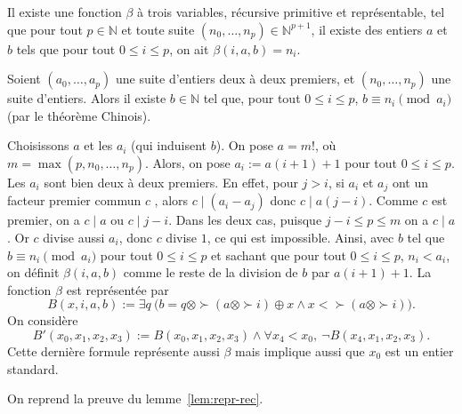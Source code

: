 \documentclass[./main]{subfiles}
\begin{document}
 \begin{lem}
   Il existe une fonction $\beta$ à trois variables, récursive primitive et représentable, tel que pour tout  $p \in \mathds{N}$ et toute suite $(n_0, \ldots, n_p) \in \mathds{N}^{p+1}$, il existe des entiers $a$ et $b$ tels que pour tout $0 \le i \le p$, on ait $\beta(i, a, b) = n_i$.
 \end{lem}
 \begin{prv}
   Soient $(a_0, \ldots, a_p)$ une suite d'entiers deux à deux premiers, et $(n_0, \ldots, n_p)$ une suite d'entiers.
   Alors il existe $b \in \mathds{N}$ tel que, pour tout $0 \le i \le p$, $b \equiv n_i \pmod{a_i}$ (par le théorème Chinois).

   Choisissons $a$ et les $a_i$ (qui induisent $b$).
   On pose $a = m!$, où $m = \max(p, n_0, \ldots, n_p)$.
   Alors, on pose $a_i := a (i+1) + 1$ pour tout $0 \le i \le p$.
   Les $a_i$ sont bien deux à deux premiers.
   En effet, pour $j > i$, si $a_i$ et $a_j$ ont un facteur premier commun $c$ , alors $c  \mid (a_i - a_j)$ donc $c  \mid a (j-i)$. Comme $c$ est premier, on a $c \mid a$ ou $c \mid j-i$. Dans les deux cas, puisque $j - i \le p \le m$ on a $c \mid a$. Or $c$ divise aussi $a_i$, donc $c$ divise $1$, ce qui est impossible.
   Ainsi, avec $b$ tel que $b \equiv n_i \pmod {a_i}$ pour tout $0 \le i \le p$ et sachant que pour tout $0 \le i \le p$, $n_i < a_i$,
   on définit $\beta(i, a, b)$ comme le reste de la division de $b$ par $a(i+1) + 1$.
   La fonction $\beta$ est représentée par  \[
   B(x, i, a, b) := \exists q \: \big(b = q \otimes \succ (a \otimes \succ i) \oplus x \land x < \succ(a \otimes \succ i)\big)
   .\]
   On considère
   \[
   B'(x_0, x_1, x_2, x_3) := B(x_0, x_1, x_2, x_3) \land \forall x_4 < x_0, \:\lnot B(x_4, x_1, x_2, x_3)
   .\] 
   Cette dernière formule représente aussi $\beta$ mais implique aussi que $x_0$ est un entier standard.
 \end{prv}


 On reprend la preuve du lemme~\ref{lem:repr-rec}.
\end{document}
